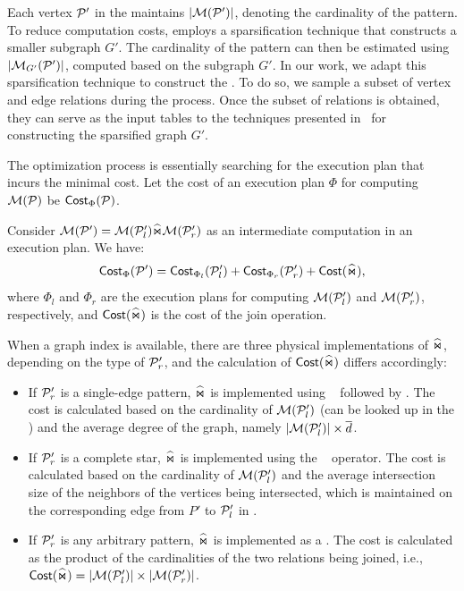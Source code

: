  Each vertex $\mathcal{P}'$ in the \glogue maintains $|\mathcal{M}(\mathcal{P}')|$, denoting the cardinality of the pattern. To reduce computation costs, \glogs employs a sparsification technique that constructs a smaller subgraph $G'$. The cardinality of the pattern can then be estimated using $|\mathcal{M}_{G'}(\mathcal{P}')|$, computed based on the subgraph $G'$. In our work, we adapt this sparsification technique to construct the \glogue. To do so, we sample a subset of vertex and edge relations during the \rgmapping process. Once the subset of relations is obtained, they can serve as the input tables to the techniques presented in~\cite{gart} for constructing the sparsified graph $G'$.

 The optimization process is essentially searching for the execution plan that incurs the minimal cost. Let the cost of an execution plan $\Phi$ for computing $\mathcal{M}(\mathcal{P})$ be ${\mathsf{Cost}}_\Phi(\mathcal{P})$. %

Consider $\mathcal{M}(\mathcal{P}') = \mathcal{M}(\mathcal{P}'_l) \widehat{\Join} \mathcal{M}(\mathcal{P}'_r)$ as an intermediate computation in an execution plan. We have:
\[
{\mathsf{Cost}}_{\Phi}(\mathcal{P}') = {\mathsf{Cost}}_{\Phi_l}(\mathcal{P}'_l) + {\mathsf{Cost}}_{\Phi_r}(\mathcal{P}'_r) + {\mathsf{Cost}}(\widehat{\Join}),
\]
where $\Phi_l$ and $\Phi_r$ are the execution plans for computing $\mathcal{M}(\mathcal{P}'_l)$ and $\mathcal{M}(\mathcal{P}'_r)$, respectively, and ${\mathsf{Cost}}(\widehat{\Join})$ is the cost of the join operation.

When a graph index is available, there are three physical implementations of $\widehat{\Join}$, depending on the type of $\mathcal{P}'_r$, and the calculation of ${\mathsf{Cost}}(\widehat{\Join})$ differs accordingly:
\begin{itemize}
\item If $\mathcal{P}'_r$ is a single-edge pattern, $\widehat{\Join}$ is implemented using \expandedge~ followed by \getvertex. The cost is calculated based on the cardinality of $\mathcal{M}(\mathcal{P}'_l)$ (can be looked up in the \glogue) and the average degree of the graph, namely $|\mathcal{M}(\mathcal{P}'_l)| \times \overline{d}$.
\item If $\mathcal{P}'_r$ is a complete star, $\widehat{\Join}$ is implemented using the \expandintersect~ operator. The cost is calculated based on the cardinality of $\mathcal{M}(\mathcal{P}'_l)$ and the average intersection size of the neighbors of the vertices being intersected, which is maintained on the corresponding edge from $P'$ to $\mathcal{P}'_l$ in \glogue.
\item  If $\mathcal{P}'_r$ is any arbitrary pattern, $\widehat{\Join}$ is implemented as a \hashjoin. The cost is calculated as the product of the cardinalities of the two relations being joined, i.e., ${\mathsf{Cost}}(\widehat{\Join}) = |\mathcal{M}(\mathcal{P}'_l)| \times |\mathcal{M}(\mathcal{P}'_r)|$.
\end{itemize}

